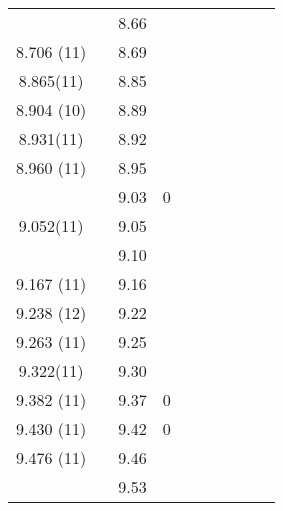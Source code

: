 \begin{landscape}
\begin{center}
\begin{longtable}{cc cc cc cc cc}
                &              & 8.66     &         &            &                &       &          &          &      \\
  8.706 (11)    &              & 8.69     &         &            &                &       &          &          &      \\
   8.865(11)    &              & 8.85     &         &            &                &       &          &          &      \\
  8.904 (10)    &              & 8.89     &         &            &                &       &          &          &      \\
  8.931(11)     &              & 8.92     &         &            &                &       &          &          &      \\
  8.960 (11)    &              & 8.95     &         &            &                &       &          &          &      \\
                &              & 9.03     & 0       &            &                &       &          &          &      \\
   9.052(11)    &              & 9.05     &         &            &                &       &          &          &      \\
                &              & 9.10     &         &            &                &       &          &          &      \\
  9.167 (11)    &              & 9.16     &         &            &                &       &          &          &      \\
  9.238 (12)    &              & 9.22     &         &            &                &       &          &          &      \\
  9.263 (11)    &              & 9.25     &         &            &                &       &          &          &      \\
   9.322(11)    &              & 9.30     &         &            &                &       &          &          &      \\
  9.382 (11)    &              & 9.37     & 0       &            &                &       &          &          &      \\
  9.430 (11)    &              & 9.42     & 0       &            &                &       &          &          &      \\
  9.476 (11)    &              & 9.46     &         &            &                &       &          &          &      \\
                &              & 9.53     &         &            &                &       &          &          &      \\

\end{longtable}
\end{center}
\end{landscape}
